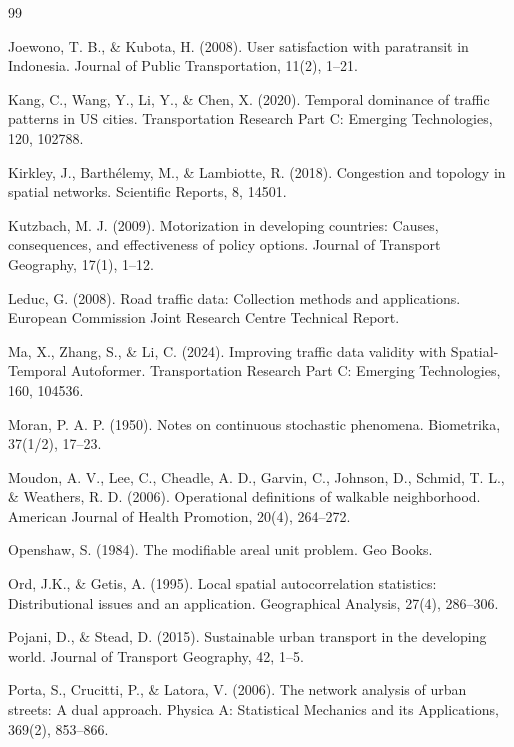 \documentclass[12pt,a4paper]{article}
\begin{document}
\begin{thebibliography}{99}
\item Joewono, T. B., \& Kubota, H. (2008). User satisfaction with paratransit in Indonesia. Journal of Public Transportation, 11(2), 1--21.

\item Kang, C., Wang, Y., Li, Y., \& Chen, X. (2020). Temporal dominance of traffic patterns in US cities. Transportation Research Part C: Emerging Technologies, 120, 102788.

\item Kirkley, J., Barthélemy, M., \& Lambiotte, R. (2018). Congestion and topology in spatial networks. Scientific Reports, 8, 14501.

\item Kutzbach, M. J. (2009). Motorization in developing countries: Causes, consequences, and effectiveness of policy options. Journal of Transport Geography, 17(1), 1--12.

\item Leduc, G. (2008). Road traffic data: Collection methods and applications. European Commission Joint Research Centre Technical Report.

\item Ma, X., Zhang, S., \& Li, C. (2024). Improving traffic data validity with Spatial-Temporal Autoformer. Transportation Research Part C: Emerging Technologies, 160, 104536.

\item Moran, P. A. P. (1950). Notes on continuous stochastic phenomena. Biometrika, 37(1/2), 17--23.

\item Moudon, A. V., Lee, C., Cheadle, A. D., Garvin, C., Johnson, D., Schmid, T. L., \& Weathers, R. D. (2006). Operational definitions of walkable neighborhood. American Journal of Health Promotion, 20(4), 264--272.

\item Openshaw, S. (1984). The modifiable areal unit problem. Geo Books.

\item Ord, J.K., \& Getis, A. (1995). Local spatial autocorrelation statistics: Distributional issues and an application. Geographical Analysis, 27(4), 286--306.

\item Pojani, D., \& Stead, D. (2015). Sustainable urban transport in the developing world. Journal of Transport Geography, 42, 1--5.

\item Porta, S., Crucitti, P., \& Latora, V. (2006). The network analysis of urban streets: A dual approach. Physica A: Statistical Mechanics and its Applications, 369(2), 853--866.


\end{thebibliography}
\end{document}
